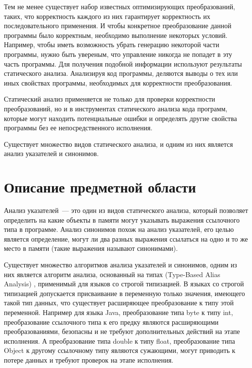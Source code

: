 \documentclass[14pt,titlepage]{extarticle}
\newcommand{\eng}[1]{{\English#1}}
\begin{document}
    Тем не менее существует набор известных оптимизирующих преобразований,
    таких, что корректность каждого из них гарантирует корректность их
    последовательного применения.
    И чтобы конкретное преобразование данной программы было корректным,
    необходимо выполнение некоторых условий. Например, чтобы иметь
    возможность убрать генерацию некоторой части программы, нужно быть
    увереным, что управление никогда не попадет в эту часть программы.
    Для получения подобной информации используют результаты статического
    анализа. Анализируя код программы, деляются выводы о тех или иных свойствах
    программы, необходимых для корректности преобразования.

    Статический анализ применяется не только для проверки
    корректности преобразований, но и в инструментах статического анализа
    кода программ, которые могут находить потенциальные ошибки и определять
    другие свойства программы без ее непосредственного исполнения.

    Существует множество видов статического анализа, и одним из них
    является анализ указателей и синонимов.

  \newpage
  \section{Описание предметной области}

    Анализ указателей~--- это один из видов статического анализа, который
    позволяет определить на какие объекты в памяти могут указывать выражения
    ссылочного типа в программе. Анализ синонимов похож на анализ указателей,
    его целью является определение, могут ли два разных выражения ссылаться
    на одно и то же место в памяти (такие выражения называют синонимами).

    Существует множество алгоритмов анализа указателей и синонимов,
    одним из них является алгоритм анализа, основанный на типах
    (\eng{Type-Based Alias Analysis}) \cite{diwan_tbaa},
    применимый для языков со строгой типизацией.
    В языках со строгой типизацией допускается присваивание в переменную только
    значения, имеющего такой тип данных, что существует расширяющее
    преобразование к типу этой переменной.
    Например для языка Java, преобразование типа byte к типу int,
    преобразование ссылочного типа к его предку являются расширяющими
    преобразованиями, безопасны и не требуют дополнительных действий на этапе
    исполнения. А преобразование типа double к типу float, преобразование типа
    Object к другому ссылочному типу являются сужающими, могут приводить к
    потере данных и требуют проверок на этапе исполнения.
\end{document}
